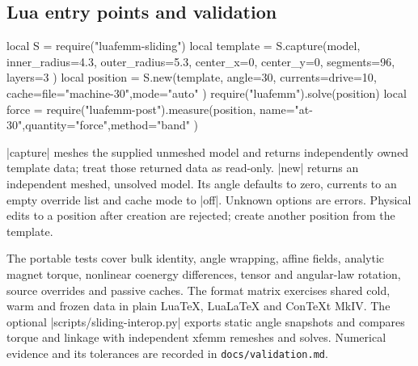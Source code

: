 \subsection{Lua entry points and validation}
\begin{codeexample}
local S = require("luafemm-sliding")
local template = S.capture(model, {
  inner_radius=4.3, outer_radius=5.3,
  center_x=0, center_y=0, segments=96, layers=3
})
local position = S.new(template, {
  angle=30, currents={drive=10},
  cache={file="machine-30",mode="auto"}
})
require("luafemm").solve(position)
local force = require("luafemm-post").measure(position, {
  name="at-30",quantity="force",method="band"
})
\end{codeexample}
|capture| meshes the supplied unmeshed model and returns independently owned
template data; treat those returned data as read-only. |new| returns an independent
meshed, unsolved model. Its angle defaults to zero, currents to an empty override
list and cache mode to |off|. Unknown options are errors. Physical edits to a
position after creation are rejected; create another position from the template.

The portable tests cover bulk identity, angle wrapping, affine fields, analytic
magnet torque, nonlinear coenergy differences, tensor and angular-law rotation,
source overrides and passive caches. The format matrix exercises shared cold,
warm and frozen data in plain LuaTeX, LuaLaTeX and ConTeXt MkIV. The optional
|scripts/sliding-interop.py| exports static angle snapshots and compares torque
and linkage with independent xfemm remeshes and solves. Numerical evidence and
its tolerances are recorded in \nolinkurl{docs/validation.md}.
